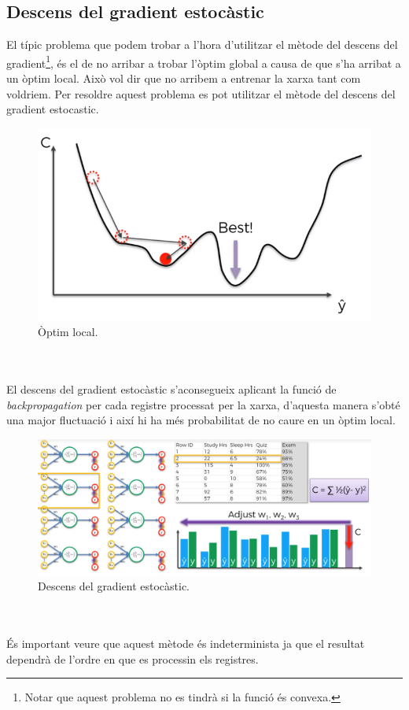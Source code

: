 \documentclass[12pt]{article}
\begin{document}
\clearpage
\subsection{Descens del gradient estocàstic\label{dge}}
El típic problema que podem trobar a l'hora d'utilitzar el mètode del descens del gradient\footnote{Notar que aquest problema no es tindrà si la funció és convexa.}, és el de no arribar a trobar l'òptim global a causa de que s'ha arribat a un òptim local. Això vol dir que no arribem a entrenar la xarxa tant com voldriem. Per resoldre aquest problema es pot utilitzar el mètode del descens del gradient estocastic.
\begin{figure}[h!]
	\centering
	\includegraphics[scale=0.4]{imatges/dge/1dge.png}
	\caption{Òptim local.}
\end{figure}
\\\\El descens del gradient estocàstic s'aconsegueix aplicant la funció de \textit{backpropagation} per cada registre processat per la xarxa, d'aquesta manera s'obté una major fluctuació i així hi ha més probabilitat de no caure en un òptim local.
\pagebreak
\begin{figure}[h!]
	\centering
	\includegraphics[scale=0.4]{imatges/dge/2dge.png}
	\caption{Descens del gradient estocàstic.}
\end{figure}
\\\\És important veure que aquest mètode és indeterminista ja que el resultat dependrà de l'ordre en que es processin els registres.
\end{document}

